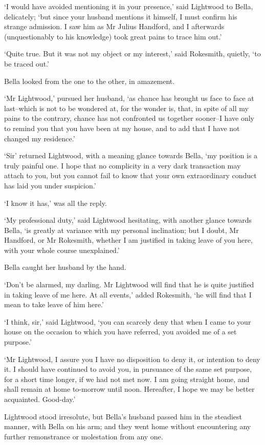 ‘I would have avoided mentioning it in your presence,’ said Lightwood to
Bella, delicately; ‘but since your husband mentions it himself, I must
confirm his strange admission. I saw him as Mr Julius Handford, and I
afterwards (unquestionably to his knowledge) took great pains to trace
him out.’

‘Quite true. But it was not my object or my interest,’ said Rokesmith,
quietly, ‘to be traced out.’

Bella looked from the one to the other, in amazement.

‘Mr Lightwood,’ pursued her husband, ‘as chance has brought us face to
face at last--which is not to be wondered at, for the wonder is, that,
in spite of all my pains to the contrary, chance has not confronted
us together sooner--I have only to remind you that you have been at my
house, and to add that I have not changed my residence.’

‘Sir’ returned Lightwood, with a meaning glance towards Bella, ‘my
position is a truly painful one. I hope that no complicity in a very
dark transaction may attach to you, but you cannot fail to know that
your own extraordinary conduct has laid you under suspicion.’

‘I know it has,’ was all the reply.

‘My professional duty,’ said Lightwood hesitating, with another glance
towards Bella, ‘is greatly at variance with my personal inclination; but
I doubt, Mr Handford, or Mr Rokesmith, whether I am justified in taking
leave of you here, with your whole course unexplained.’

Bella caught her husband by the hand.

‘Don’t be alarmed, my darling. Mr Lightwood will find that he is quite
justified in taking leave of me here. At all events,’ added Rokesmith,
‘he will find that I mean to take leave of him here.’

‘I think, sir,’ said Lightwood, ‘you can scarcely deny that when I came
to your house on the occasion to which you have referred, you avoided me
of a set purpose.’

‘Mr Lightwood, I assure you I have no disposition to deny it, or
intention to deny it. I should have continued to avoid you, in pursuance
of the same set purpose, for a short time longer, if we had not met now.
I am going straight home, and shall remain at home to-morrow until noon.
Hereafter, I hope we may be better acquainted. Good-day.’

Lightwood stood irresolute, but Bella’s husband passed him in the
steadiest manner, with Bella on his arm; and they went home without
encountering any further remonstrance or molestation from any one.

